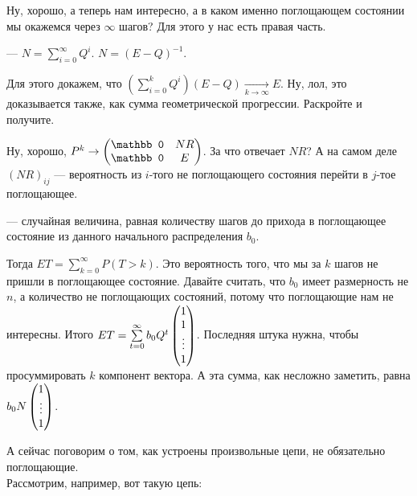\documentclass{article}
\begin{document}
\begin{itemize}
\begin{Proof}
        \end{Proof}
        \begin{Proof}
            Ну, хорошо, а теперь нам интересно, а в каком именно поглощающем состоянии мы окажемся через $\infty$ шагов? Для этого у нас есть правая часть.
        \end{Proof}
        \dfn {} --- $N=\sum\limits_{i=0}^\infty Q^i$.
        \thm $N=(E-Q)^{-1}$.
        \begin{Proof}
            Для этого докажем, что $\left(\sum\limits_{i=0}^kQ^i\right)(E-Q)\underset{k\to\infty}\rightarrow E$. Ну, лол, это доказывается также, как сумма геометрической прогрессии. Раскройте и получите.
        \end{Proof}
        \begin{Comment}
            Ну, хорошо, $P^k\rightarrow\matr{\mathbb0 & NR\\\mathbb0 & E}$. За что отвечает $NR$? А на самом деле $(NR)_{ij}$ --- вероятность из $i$-того не поглощающего состояния перейти в $j$-тое поглощающее.
        \end{Comment}
        \dfn {} --- случайная величина, равная количеству шагов до прихода в поглощающее состояние из данного начального распределения $b_0$.
        \begin{Comment}
            Тогда $ET=\sum\limits_{k=0}^\infty P(T>k)$. Это вероятность того, что мы за $k$ шагов не пришли в поглощающее состояние. Давайте считать, что $b_0$ имеет размерность не $n$, а количество не поглощающих состояний, потому что поглощающие нам не интересны. Итого $ET=\sum\limits_{t=0}^\infty b_0Q^t\left(\begin{matrix}1\\1\\\vdots\\1\end{matrix}\right)$. Последняя штука нужна, чтобы просуммировать $k$ компонент вектора. А эта сумма, как несложно заметить, равна $b_0N\left(\begin{matrix}1\\\vdots\\1\end{matrix}\right)$.
        \end{Comment}
        \begin{Comment}
            А сейчас поговорим о том, как устроены произвольные цепи, не обязательно поглощающие.\\
            Рассмотрим, например, вот такую цепь:
            \begin{figure}[H]
\end{figure}
\end{Comment}
\end{itemize}
\end{document}
